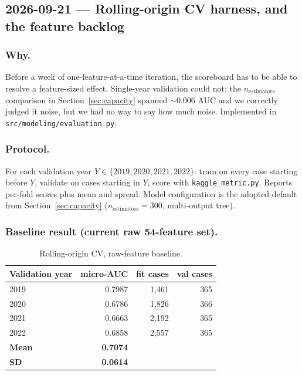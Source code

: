 \subsection{2026-09-21 --- Rolling-origin CV harness, and the feature backlog}
\label{sec:cv-harness}

\subsubsection*{Why.} Before a week of one-feature-at-a-time iteration, the scoreboard has to be
able to resolve a feature-sized effect. Single-year validation could not: the
$n_{\text{estimators}}$ comparison in Section~\ref{sec:capacity} spanned $\sim$0.006 AUC and we
correctly judged it noise, but we had no way to say how much noise. Implemented in
\texttt{src/modeling/evaluation.py}.

\subsubsection*{Protocol.} For each validation year $Y \in \{2019, 2020, 2021, 2022\}$: train on
every case starting before $Y$, validate on cases starting in $Y$, score with
\texttt{kaggle\_metric.py}. Reports per-fold scores plus mean and spread. Model configuration is
the adopted default from Section~\ref{sec:capacity} ($n_{\text{estimators}}=300$, multi-output
tree).

\subsubsection*{Baseline result (current raw 54-feature set).}

\begin{table}[htbp]
  \centering
  \caption{Rolling-origin CV, raw-feature baseline.}
  \label{tab:cv-baseline}
  \begin{tabular}{lrrr}
    \toprule
    Validation year & micro-AUC & fit cases & val cases \\
    \midrule
    2019 & 0.7987 & 1{,}461 & 365 \\
    2020 & 0.6786 & 1{,}826 & 366 \\
    2021 & 0.6663 & 2{,}192 & 365 \\
    2022 & 0.6858 & 2{,}557 & 365 \\
    \midrule
    \textbf{Mean} & \textbf{0.7074} & & \\
    \textbf{SD}   & \textbf{0.0614} & & \\
    \bottomrule
  \end{tabular}
\end{table}

